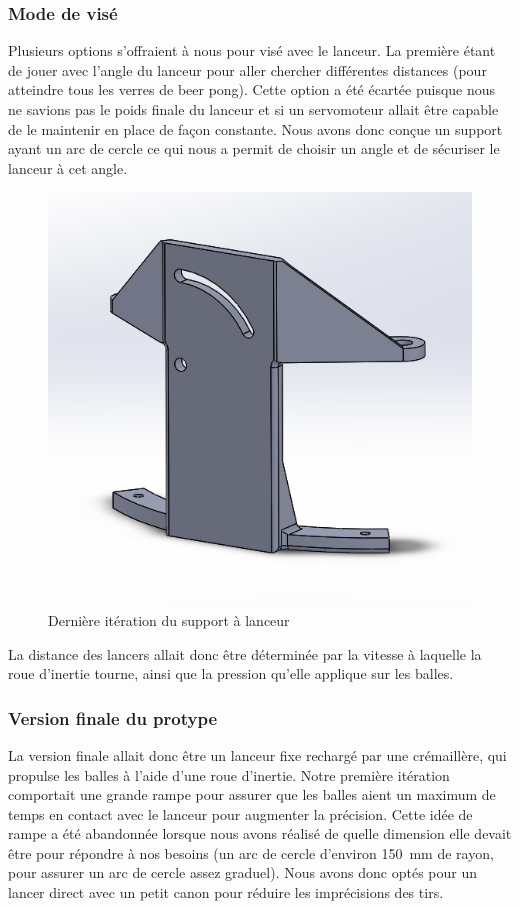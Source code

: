 \subsubsection{Mode de visé}
Plusieurs options s’offraient à nous pour visé avec le lanceur.
La première étant de jouer avec l’angle du lanceur pour aller chercher différentes distances (pour atteindre tous les verres de beer pong).
Cette option a été écartée puisque nous ne savions pas le poids finale du lanceur et si un servomoteur allait être capable de le maintenir en place de façon constante.
Nous avons donc conçue un support ayant un arc de cercle ce qui nous a permit de choisir un angle et de sécuriser le lanceur à cet angle.

\begin{figure}[h!]
    \centering
    \includegraphics[width=0.5\linewidth]{img/s2/cad/support}
    \caption{Dernière itération du support à lanceur}
    \label{fig:s2-cad-support}
\end{figure}

La distance des lancers allait donc être déterminée par la vitesse à laquelle la roue d’inertie tourne, ainsi que la pression qu’elle applique sur les balles.

\subsubsection{Version finale du protype}
La version finale allait donc être un lanceur fixe rechargé par une crémaillère, qui propulse les balles à l’aide d’une roue d’inertie.
Notre première itération comportait une grande rampe pour assurer que les balles aient un maximum de temps en contact avec le lanceur pour augmenter la précision.
Cette idée de rampe a été abandonnée lorsque nous avons réalisé de quelle dimension elle devait être pour répondre à nos besoins (un arc de cercle d’environ 150~mm de rayon, pour assurer un arc de cercle assez graduel).
Nous avons donc optés pour un lancer direct avec un petit canon pour réduire les imprécisions des tirs.

